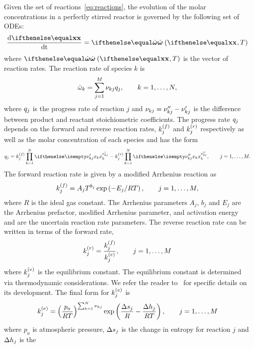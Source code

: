 \documentclass[fontsize=12pt, %
               paper=a4, %
               hyperref]{report}
\begin{document}
  Given the set of reactions~\eqref{eq:reactions}, the evolution of the
  molar concentrations in a perfectly stirred reactor is governed by the
  following set of ODEs:
  \begin{align}
     \odeone{\xc}{\time} = \rr\lr{\xc, T} \label{eq:ode_reactions}
  \end{align}
  where $\rr\lr{\xc, T}$ is the vector of reaction rates.  The reaction 
  rate of species $k$ is
  \begin{align}
    \dot{\omega}_{k} = \sum_{j=1}^{M}{\nu_{kj}q_{j}}, \qquad k = 1,\ldots,N,
    \label{eq:rrk}
  \end{align}
  where $q_{j}$ is the progress rate of reaction $j$ and $\nu_{kj} =
  \nu_{kj}^{\prime\prime} - \nu_{kj}^{\prime}$ is the difference between product and reactant
  stoichiometric coefficients.  The progress rate $q_{j}$ depends on
  the forward and reverse reaction rates, $k_{j}^{\left(f\right)}$ and $k_{j}^{\left(r\right)}$ respectively
  as well as the molar concentration of each species and has the form
  \begin{align}
    \pr{j} = \kf\prod_{k=1}^{N}{\displaystyle\xk{k}{\nur}} - 
             \kr\prod_{k=1}^{N}{\displaystyle\xk{k}{\nup}}, 
    \qquad j = 1,\ldots,M.
  \end{align}
  The forward reaction rate is given by a modified Arrhenius 
  reaction as
  \begin{align}
    k_{j}^{\left(f\right)} = A_{j}T^{b_{j}}\exp\left(-E_{j}/RT\right), 
    \qquad j = 1,\ldots,M, 
    \label{eq:arrhenius}
  \end{align}
  where $R$ is the ideal gas constant.  The Arrhenius parameters $A_{j}$, $b_{j}$ and $E_{j}$ 
  are the Arrhenius prefactor, modified Arrhenius parameter, and activation energy and are the 
  uncertain reaction rate parameters.  The reverse reaction rate can be written in terms of the 
  forward rate,
  \begin{align}
    k_{j}^{\left(r\right)} = \frac{k_{j}^{\left(f\right)}}{k_{j}^{\left(e\right)}}, \qquad j = 1,\ldots,M
  \end{align}
  where $k_{j}^{\left(e\right)}$ is the equilibrium constant.  The equilibrium 
  constant is determined via thermodynamic considerations.  We 
  refer the reader to~\cite[Ch.9.3]{kee2005chemically} for specific 
  details on its development.  The final form for $k_{j}^{\left(e\right)}$ is 
  \begin{align}
    k_{j}^{\left(e\right)} = \left(\frac{p_{a}}{RT}\right)^{\sum_{k=1}^{N}{\nu_{kj}}}
          \exp\left(\frac{\Delta s_{j}}{R} - \frac{\Delta h_{j}}{RT}\right), 
    \qquad j = 1,\ldots,M
  \end{align}
  where $p_{a}$ is atmospheric pressure, $\Delta s_{j}$ is the 
  change in entropy for reaction $j$ and $\Delta h_{j}$ is the 
\end{document}
